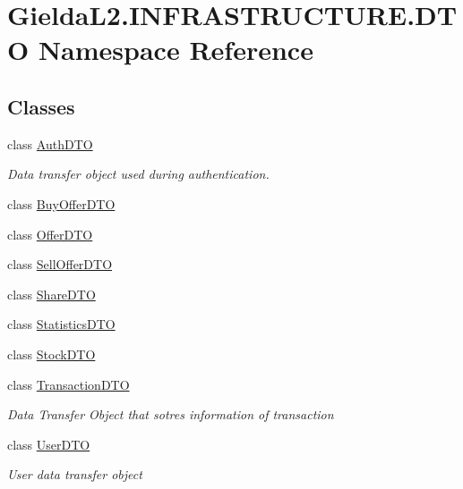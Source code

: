 \hypertarget{namespace_gielda_l2_1_1_i_n_f_r_a_s_t_r_u_c_t_u_r_e_1_1_d_t_o}{}\section{Gielda\+L2.\+I\+N\+F\+R\+A\+S\+T\+R\+U\+C\+T\+U\+R\+E.\+D\+TO Namespace Reference}
\label{namespace_gielda_l2_1_1_i_n_f_r_a_s_t_r_u_c_t_u_r_e_1_1_d_t_o}
\subsection*{Classes}
\begin{DoxyCompactItemize}
\item 
class \mbox{\hyperlink{class_gielda_l2_1_1_i_n_f_r_a_s_t_r_u_c_t_u_r_e_1_1_d_t_o_1_1_auth_d_t_o}{Auth\+D\+TO}}
\begin{DoxyCompactList}\small\item\em Data transfer object used during authentication. \end{DoxyCompactList}\item 
class \mbox{\hyperlink{class_gielda_l2_1_1_i_n_f_r_a_s_t_r_u_c_t_u_r_e_1_1_d_t_o_1_1_buy_offer_d_t_o}{Buy\+Offer\+D\+TO}}
\item 
class \mbox{\hyperlink{class_gielda_l2_1_1_i_n_f_r_a_s_t_r_u_c_t_u_r_e_1_1_d_t_o_1_1_offer_d_t_o}{Offer\+D\+TO}}
\item 
class \mbox{\hyperlink{class_gielda_l2_1_1_i_n_f_r_a_s_t_r_u_c_t_u_r_e_1_1_d_t_o_1_1_sell_offer_d_t_o}{Sell\+Offer\+D\+TO}}
\item 
class \mbox{\hyperlink{class_gielda_l2_1_1_i_n_f_r_a_s_t_r_u_c_t_u_r_e_1_1_d_t_o_1_1_share_d_t_o}{Share\+D\+TO}}
\item 
class \mbox{\hyperlink{class_gielda_l2_1_1_i_n_f_r_a_s_t_r_u_c_t_u_r_e_1_1_d_t_o_1_1_statistics_d_t_o}{Statistics\+D\+TO}}
\item 
class \mbox{\hyperlink{class_gielda_l2_1_1_i_n_f_r_a_s_t_r_u_c_t_u_r_e_1_1_d_t_o_1_1_stock_d_t_o}{Stock\+D\+TO}}
\item 
class \mbox{\hyperlink{class_gielda_l2_1_1_i_n_f_r_a_s_t_r_u_c_t_u_r_e_1_1_d_t_o_1_1_transaction_d_t_o}{Transaction\+D\+TO}}
\begin{DoxyCompactList}\small\item\em Data Transfer Object that sotres information of transaction \end{DoxyCompactList}\item 
class \mbox{\hyperlink{class_gielda_l2_1_1_i_n_f_r_a_s_t_r_u_c_t_u_r_e_1_1_d_t_o_1_1_user_d_t_o}{User\+D\+TO}}
\begin{DoxyCompactList}\small\item\em User data transfer object \end{DoxyCompactList}\end{DoxyCompactItemize}
